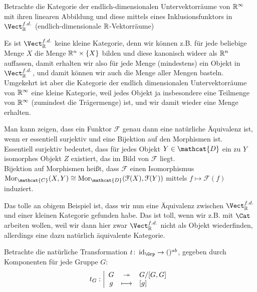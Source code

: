     \begin{example}
        Betrachte die Kategorie der endlich-dimensionalen Untervektorräume von $\mathbb{R}^{\infty}$ mit ihren linearen Abbildung und diese mittels eines Inklusionsfunktors in $\Vect_{\R}^{f.d.}$ (endlich-dimensionale $\mathbb{R}$-Vektorräume)
    \end{example}

    \begin{oral}
        Es ist $\Vect_{\R}^{f.d.}$ keine kleine Kategorie, denn wir können z.B. für jede beliebige Menge $X$ die Menge  $\mathbb{R}^n \times \left \{X\right\} $ bilden und diese kanonisch wideer als $\mathbb{R}^n$ auffassen, damit erhalten wir also für jede Menge (mindestens) ein Objekt in $\Vect_{\R}^{f.d.}$, und damit können wir auch die Menge aller Mengen basteln. \\
        Umgekehrt ist aber die Kategorie der endlich dimensionalen Untervektorräume von $\mathbb{R}^{\infty}$ eine kleine Kategorie, weil jedes Objekt ja insbesondere eine Teilmenge von $\mathbb{R}^{\infty}$ (zumindest die Trägermenge) ist, und wir damit wieder eine Menge erhalten.
    \end{oral}

    \begin{oral}
        Man kann zeigen, dass ein Funktor $\mathcal{F}$ genau dann eine natürliche Äquivalenz ist, wenn er essentiell surjektiv  und eine Bijektion auf den Morphismen ist. \\
        Essentiell surjektiv bedeutet, dass für jedes Objekt $Y\in \mathcat{D}$ ein zu $Y$ isomorphes Objekt  $Z$ existiert, das im Bild von  $\mathcal{F}$ liegt. \\
        Bijektion auf Morphismen heißt, dass $\mathcal{F}$ einen Isomorphismus $\Mor_{\mathcat{C}}(X,Y) \cong \Mor_{\mathcat{D}}(\mathcal{F}(X), \mathcal{F}(Y))$ mittels $f \mapsto \mathcal{F}(f)$ induziert.
    \end{oral}

\begin{oral}
    Das tolle an obigem Beispiel ist, dass wir nun eine Äquivalenz zwischen $\Vect_{\R}^{f.d.}$ und einer kleinen Kategorie gefunden habe. Das ist toll, wenn wir z.B. mit $\Cat$ arbeiten wollen, weil wir dann hier zwar  $\Vect_{\R}^{f.d.}$ nicht als Objekt wiederfinden, allerdings eine dazu natürlich äquivalente Kategorie.
\end{oral}

\begin{example}
    Betrachte die natürliche Transformation $t\colon \id_{\Grp} \to  ()^{ab}$, gegeben durch Komponenten für jede Gruppe $G$:
        \begin{equation*}
        t_G: \left| \begin{array}{c c l} 
            G & \twoheadrightarrow & G / [G,G] \\
            g & \longmapsto &  [g]
        \end{array} \right.
    \end{equation*}
\end{example}

